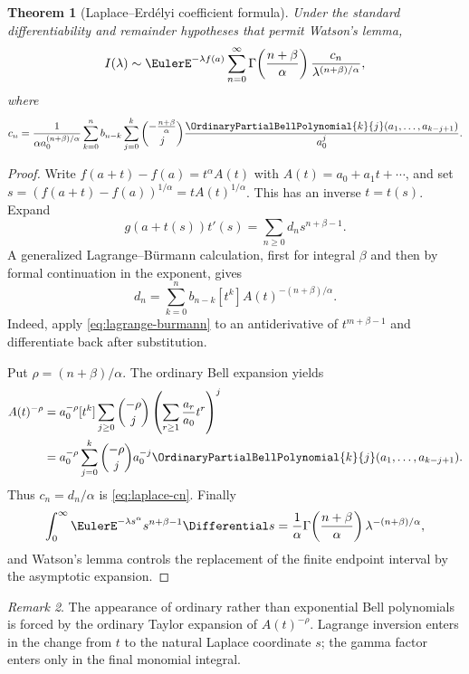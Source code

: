 \documentclass[11pt,a4paper,oneside,openany]{book}
\newtheorem{theorem}{Theorem}[chapter]
\theoremstyle{definition}
\theoremstyle{remark}
\newtheorem{remark}[theorem]{Remark}
\begin{document}
\begin{theorem}[Laplace--Erd\'elyi coefficient formula]
\label{thm:laplace-bell}
Under the standard differentiability and remainder hypotheses that permit Watson's
lemma,
\begin{equation}\label{eq:laplace-asymptotic}
 I(\lambda)\sim \EulerE^{-\lambda f(a)}
 \sum_{n=0}^{\infty}
 \Gamma\!\left(\frac{n+\beta}{\alpha}\right)
 \frac{c_n}{\lambda^{(n+\beta)/\alpha}},
\end{equation}
where
\begin{equation}\label{eq:laplace-cn}
 c_n=\frac1{\alpha a_0^{(n+\beta)/\alpha}}
 \sum_{k=0}^{n}b_{n-k}
 \sum_{j=0}^{k}
 \binom{-\frac{n+\beta}{\alpha}}{j}
 \frac{\OrdinaryPartialBellPolynomial{k}{j}(a_1,\ldots,a_{k-j+1})}{a_0^j}.
\end{equation}
\end{theorem}
\begin{proof}
Write
$f(a+t)-f(a)=t^\alpha A(t)$ with
$A(t)=a_0+a_1t+\cdots$, and set
$s=(f(a+t)-f(a))^{1/\alpha}=tA(t)^{1/\alpha}$.  This has an inverse $t=t(s)$.
Expand
\[
 g(a+t(s))t'(s)=\sum_{n\ge0}d_ns^{n+\beta-1}.
\]
A generalized Lagrange--Bürmann calculation, first for integral $\beta$ and then
by formal continuation in the exponent, gives
\[
 d_n=\sum_{k=0}^{n}b_{n-k}[t^k]A(t)^{-(n+\beta)/\alpha}.
\]
Indeed, apply \eqref{eq:lagrange-burmann} to an antiderivative of
$t^{m+\beta-1}$ and differentiate back after substitution.

Put $\rho=(n+\beta)/\alpha$.  The ordinary Bell expansion yields
\begin{align*}
 [t^k]A(t)^{-\rho}
 &=a_0^{-\rho}[t^k]
 \sum_{j\ge0}\binom{-\rho}{j}
 \left(\sum_{r\ge1}\frac{a_r}{a_0}t^r\right)^j\\
 &=a_0^{-\rho}\sum_{j=0}^{k}\binom{-\rho}{j}a_0^{-j}
 \OrdinaryPartialBellPolynomial{k}{j}(a_1,\ldots,a_{k-j+1}).
\end{align*}
Thus $c_n=d_n/\alpha$ is \eqref{eq:laplace-cn}.  Finally
\[
 \int_0^\infty \EulerE^{-\lambda s^\alpha}s^{n+\beta-1}\Differential s
 =\frac1\alpha\Gamma\!\left(\frac{n+\beta}{\alpha}\right)
 \lambda^{-(n+\beta)/\alpha},
\]
and Watson's lemma controls the replacement of the finite endpoint interval by
the asymptotic expansion.
\end{proof}

\begin{remark}
The appearance of ordinary rather than exponential Bell polynomials is forced by
the ordinary Taylor expansion of $A(t)^{-\rho}$.  Lagrange inversion enters in the
change from $t$ to the natural Laplace coordinate $s$; the gamma factor enters only
in the final monomial integral.
\end{remark}
\end{document}
